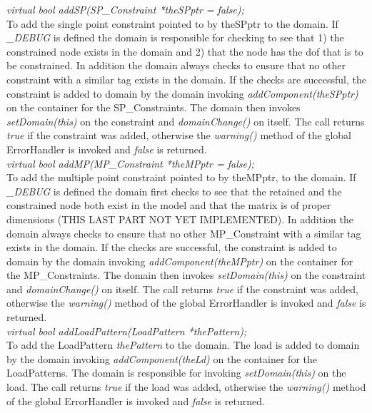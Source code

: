 {\em virtual bool addSP(SP\_Constraint *theSPptr = false);}  \\
To add the single point constraint pointed to by theSPptr to the
domain. If {\em \_DEBUG} is defined the domain is responsible for
checking to see that 1) the constrained node exists in the domain and
2) that the node has the dof that is to be constrained. 
In addition the domain always checks to ensure that no other
constraint with a similar tag exists in the domain. If the checks are
successful, the constraint is added to domain by the domain invoking {\em
addComponent(theSPptr)} on the container for the SP\_Constraints. The
domain then invokes {\em setDomain(this)} on the 
constraint and {\em domainChange()} on itself. The call returns {\em
true} if the constraint was added, otherwise the {\em warning()} method of
the global ErrorHandler is invoked and {\em false} is returned.\\



{\em virtual bool addMP(MP\_Constraint *theMPptr = false);}  \\
To add the multiple point constraint pointed to by theMPptr, to the
domain. If {\em \_DEBUG} is defined the domain first
checks to see that the retained and the constrained node both exist
in the model and that the matrix is of proper dimensions (THIS LAST
PART NOT YET IMPLEMENTED). 
In addition the domain always checks to ensure that no other
MP\_Constraint with a similar tag exists in the domain. If the checks are
successful, the constraint is added to domain by the domain invoking {\em
addComponent(theMPptr)} on the container for the MP\_Constraints. The
domain then invokes {\em setDomain(this)} on the 
constraint and {\em domainChange()} on itself. The call returns {\em
true} if the constraint was added, otherwise the {\em warning()} method of
the global ErrorHandler is invoked and {\em false} is returned.\\


{\em virtual bool addLoadPattern(LoadPattern *thePattern);}  \\ 
To add the LoadPattern {\em thePattern} to the domain.
The load is added to domain by the domain invoking {\em
addComponent(theLd)} on the container for the LoadPatterns. The domain
is responsible for invoking {\em setDomain(this)} on the load. The
call returns {\em true} if the load was added, otherwise the {\em
warning()} method of the global ErrorHandler is invoked and {\em
false} is returned.\\ 

